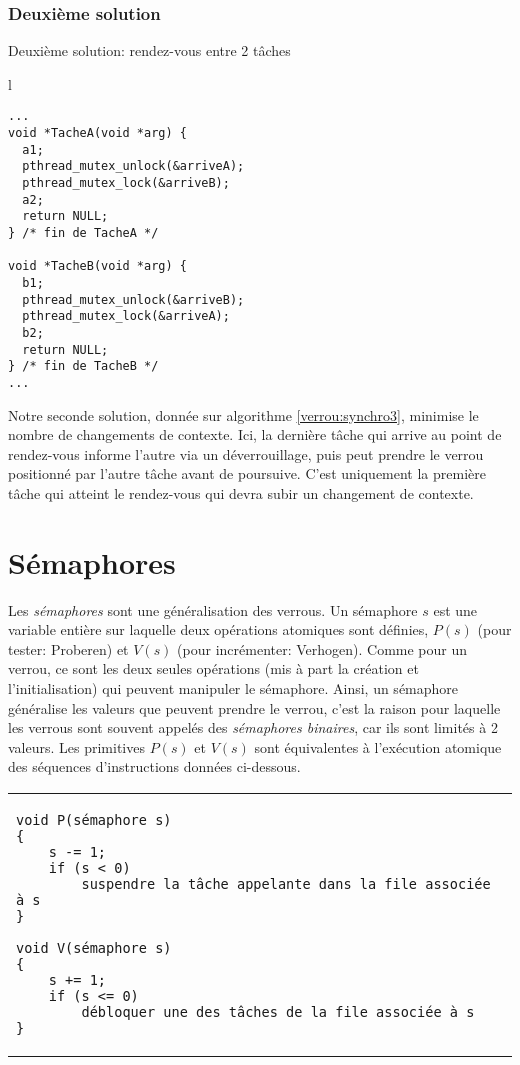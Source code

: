 \subsubsection*{Deuxième solution}
\begin{algorithm}[t]
\caption{Deuxième solution: rendez-vous entre 2 tâches}\label{verrou:synchro3}
\centering
\begin{tabular}{l}
\begin{lstlisting}
...
void *TacheA(void *arg) {
  a1;
  pthread_mutex_unlock(&arriveA);
  pthread_mutex_lock(&arriveB);
  a2;
  return NULL;
} /* fin de TacheA */

void *TacheB(void *arg) {
  b1;
  pthread_mutex_unlock(&arriveB);
  pthread_mutex_lock(&arriveA);
  b2;
  return NULL;
} /* fin de TacheB */
...
\end{lstlisting}
\end{tabular}

\end{algorithm}
Notre seconde solution, donnée sur algorithme \ref{verrou:synchro3}, minimise le nombre de changements de contexte. Ici, la dernière tâche qui arrive au point de rendez-vous informe l'autre via un déverrouillage, puis peut prendre le verrou positionné par l'autre tâche avant de poursuive. C'est uniquement la première tâche qui atteint le rendez-vous qui devra subir un changement de contexte.

\section{Sémaphores}
Les {\em sémaphores} sont une généralisation des verrous. Un sémaphore $s$ est une variable entière sur laquelle deux opérations atomiques sont définies, $P(s)$ (pour tester: Proberen) et $V(s)$ (pour incrémenter: Verhogen). Comme pour un verrou, ce sont les deux seules opérations (mis à part la création et l'initialisation) qui peuvent manipuler le sémaphore. Ainsi, un sémaphore généralise les valeurs que peuvent prendre le verrou, c'est la raison pour laquelle les verrous sont souvent appelés des {\em sémaphores binaires}, car ils sont limités à 2 valeurs.
Les primitives $P(s)$ et $V(s)$ sont équivalentes à l'exécution atomique des séquences d'instructions données ci-dessous.

\centering
\begin{tabular}{l}
\begin{lstlisting}
void P(sémaphore s)
{
	s -= 1;
	if (s < 0)
		suspendre la tâche appelante dans la file associée à s
}

void V(sémaphore s)
{
	s += 1;
	if (s <= 0)
		débloquer une des tâches de la file associée à s
}
\end{lstlisting}
\end{tabular}

